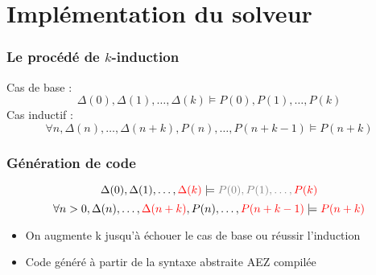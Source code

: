\documentclass[18pt]{beamer}
\begin{document}
\section{Implémentation du solveur}
\begin{frame}
	\frametitle{Le procédé de $k$-induction}
	Cas de base :	$$\Delta(0), \Delta(1), \ldots, \Delta(k) \models  P(0), P(1), \ldots,  P(k)$$
	Cas inductif : $$\forall n, {\Delta(n), \ldots, \Delta(n+k), P(n), \ldots, P(n+k-1) \models P(n+k)}$$

\end{frame}	
\begin{frame}
	\frametitle{Génération de code}

		
			$$\Delta(0), \Delta(1), \ldots, \color{red} \Delta(k) \color{black} \models \color{gray} P(0), P(1), \ldots, \color{red} P(k)\color{black}$$
			$$\forall n>0, {\Delta(n), \ldots, \color{red} \Delta(n+k) \color{black}, P(n), \ldots, \color{red}P(n+k-1) \color{black} \models  \color{red}P(n+k)}\color{black}$$
	\begin{itemize}
		\item{On augmente k jusqu'à échouer le cas de base ou réussir l'induction}
		\item{Code généré à partir de la syntaxe abstraite AEZ compilée}
	\end{itemize}	
\end{frame}


\def\optimisation{Une optimisation : élimination de cas particuliers}
\end{document}
